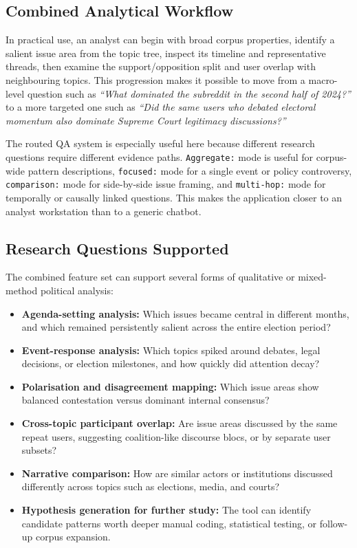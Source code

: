 \documentclass[11pt,a4paper]{article}
\begin{document}
\subsection{Combined Analytical Workflow}

In practical use, an analyst can begin with broad corpus properties, identify a salient issue area from the topic tree, inspect its timeline and representative threads, then examine the support/opposition split and user overlap with neighbouring topics. This progression makes it possible to move from a macro-level question such as \textit{``What dominated the subreddit in the second half of 2024?''} to a more targeted one such as \textit{``Did the same users who debated electoral momentum also dominate Supreme Court legitimacy discussions?''}

The routed QA system is especially useful here because different research questions require different evidence paths. \texttt{Aggregate:} mode is useful for corpus-wide pattern descriptions, \texttt{focused:} mode for a single event or policy controversy, \texttt{comparison:} mode for side-by-side issue framing, and \texttt{multi-hop:} mode for temporally or causally linked questions. This makes the application closer to an analyst workstation than to a generic chatbot.

\subsection{Research Questions Supported}

The combined feature set can support several forms of qualitative or mixed-method political analysis:

\begin{itemize}
  \item \textbf{Agenda-setting analysis:} Which issues became central in different months, and which remained persistently salient across the entire election period?
  \item \textbf{Event-response analysis:} Which topics spiked around debates, legal decisions, or election milestones, and how quickly did attention decay?
  \item \textbf{Polarisation and disagreement mapping:} Which issue areas show balanced contestation versus dominant internal consensus?
  \item \textbf{Cross-topic participant overlap:} Are issue areas discussed by the same repeat users, suggesting coalition-like discourse blocs, or by separate user subsets?
  \item \textbf{Narrative comparison:} How are similar actors or institutions discussed differently across topics such as elections, media, and courts?
  \item \textbf{Hypothesis generation for further study:} The tool can identify candidate patterns worth deeper manual coding, statistical testing, or follow-up corpus expansion.
\end{itemize}
\end{document}

